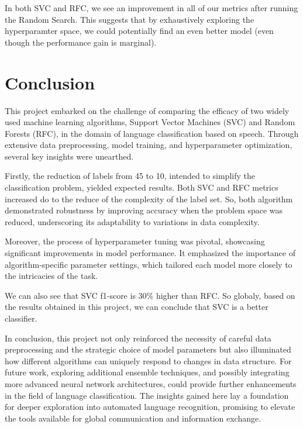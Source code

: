 \documentclass[twocolumn]{article}
\begin{document}
In both SVC and RFC, we see an improvement in all of our metrics after running the Random Search. This suggests that by exhaustively exploring the hyperparamter space, we could potentially find an even better model (even though the performance gain is marginal).  

\section{Conclusion}
This project embarked on the challenge of comparing the efficacy of two widely used machine learning algorithms, Support Vector Machines (SVC) and Random Forests (RFC), in the domain of language classification based on speech. Through extensive data preprocessing, model training, and hyperparameter optimization, several key insights were unearthed.

Firstly, the reduction of labels from 45 to 10, intended to simplify the classification problem, yielded expected results. Both SVC and RFC metrics increased do to the reduce of the complexity of the label set. So, both algorithm demonstrated robustness by improving accuracy when the problem space was reduced, underscoring its adaptability to variations in data complexity.

Moreover, the process of hyperparameter tuning was pivotal, showcasing significant improvements in model performance. It emphasized the importance of algorithm-specific parameter settings, which tailored each model more closely to the intricacies of the task.

We can also see that SVC f1-score is 30\% higher than RFC. So globaly, based on the results obtained in this project, we can conclude that SVC is a better classifier.

In conclusion, this project not only reinforced the necessity of careful data preprocessing and the strategic choice of model parameters but also illuminated how different algorithms can uniquely respond to changes in data structure. For future work, exploring additional ensemble techniques, and possibly integrating more advanced neural network architectures, could provide further enhancements in the field of language classification. The insights gained here lay a foundation for deeper exploration into automated language recognition, promising to elevate the tools available for global communication and information exchange.
\end{document}
